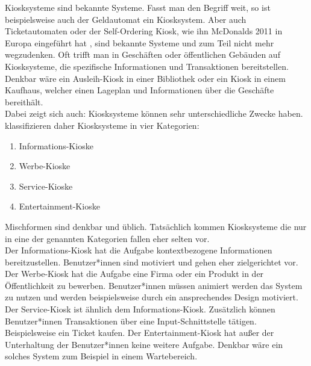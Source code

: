 Kiosksysteme sind bekannte Systeme. Fasst man den Begriff weit, so ist beispielsweise auch der Geldautomat ein Kiosksystem.
Aber auch Ticketautomaten oder der Self-Ordering Kiosk, wie ihn McDonalds 2011 in Europa 
eingeführt hat \cite{mcdonalds}, sind bekannte Systeme und zum Teil nicht mehr wegzudenken. Oft trifft man in 
Geschäften oder öffentlichen Gebäuden auf Kiosksysteme, die spezifische Informationen und Transaktionen 
bereitstellen. Denkbar wäre ein Ausleih-Kiosk in einer Bibliothek oder ein Kiosk in einem Kaufhaus, welcher einen
Lageplan und Informationen über die Geschäfte bereithält.\\

Dabei zeigt sich auch: Kiosksysteme können sehr unterschiedliche Zwecke haben.  klassifizieren daher
Kiosksysteme in vier Kategorien:

\begin{enumerate}
\item Informations-Kioske
\item Werbe-Kioske
\item Service-Kioske
\item Entertainment-Kioske
\end{enumerate}

Mischformen sind denkbar und üblich. Tatsächlich kommen Kiosksysteme die nur in eine der genannten Kategorien fallen
eher selten vor.\\
Der Informations-Kiosk hat die Aufgabe kontextbezogene Informationen bereitzustellen. Benutzer*innen sind motiviert und
gehen eher zielgerichtet vor. 
Der Werbe-Kiosk hat die Aufgabe eine Firma oder ein Produkt in der Öffentlichkeit zu
bewerben. Benutzer*innen müssen animiert werden das System zu nutzen und werden beispielsweise durch ein ansprechendes
Design motiviert.
Der Service-Kiosk ist ähnlich dem Informations-Kiosk. Zusätzlich können Benutzer*innen Transaktionen über eine 
Input-Schnittstelle tätigen. Beispielsweise ein Ticket kaufen.
Der Entertainment-Kiosk hat außer der Unterhaltung der Benutzer*innen keine weitere Aufgabe. Denkbar wäre ein solches
System zum Beispiel in einem Wartebereich. 